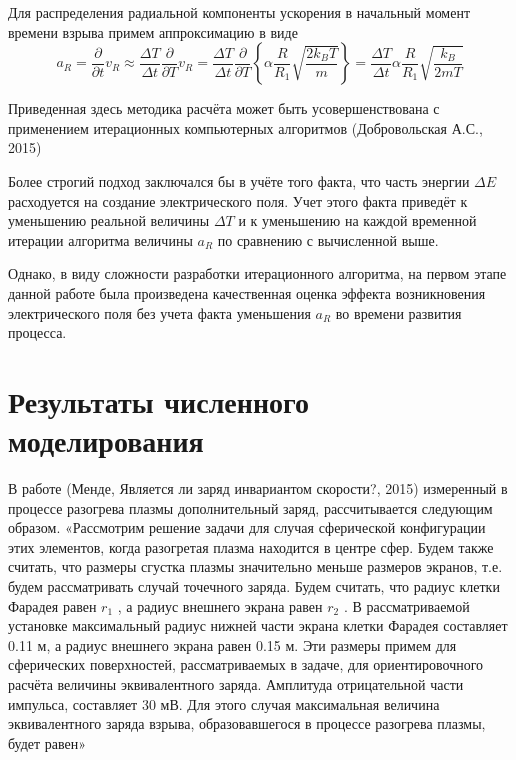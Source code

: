 ﻿\documentclass[12pt, letterpaper]{article}
\begin{document}
Для распределения радиальной компоненты ускорения в начальный момент времени взрыва примем аппроксимацию в виде
$${{a}_{R}}=\frac{\partial }{\partial t}{{v}_{R}}\approx \frac{\Delta T}{\Delta t}\frac{\partial }{\partial T}{{v}_{R}}=\frac{\Delta T}{\Delta t}\frac{\partial }{\partial T}\left\{ \alpha \frac{R}{{{R}_{1}}}\sqrt{\frac{2{{k}_{B}}T}{m}} \right\}=\frac{\Delta T}{\Delta t}\alpha \frac{R}{{{R}_{1}}}\sqrt{\frac{{{k}_{B}}}{2mT}}$$


Приведенная здесь методика расчёта может быть усовершенствована с применением итерационных компьютерных алгоритмов (Добровольская А.С., 2015)

Более строгий подход заключался бы в учёте того факта, что часть энергии $\Delta E$ расходуется на создание электрического поля. Учет этого факта приведёт к уменьшению реальной величины $\Delta T$ и к уменьшению на каждой временной итерации алгоритма величины ${{a}_{R}}$ по сравнению с вычисленной выше. 

Однако, в виду сложности разработки итерационного алгоритма, на первом этапе данной работе была произведена качественная оценка эффекта возникновения электрического поля без учета факта уменьшения ${{a}_{R}}$ во времени развития процесса.

\section{Результаты численного моделирования}




В работе (Менде, Является ли заряд инвариантом скорости?, 2015) измеренный в процессе разогрева плазмы дополнительный заряд, рассчитывается следующим образом. «Рассмотрим решение задачи для случая сферической конфигурации этих элементов, когда разогретая плазма находится в центре сфер. Будем также считать, что размеры сгустка плазмы значительно меньше размеров экранов, т.е. будем рассматривать случай точечного заряда. Будем считать, что радиус клетки Фарадея равен ${{r}_{1}}$ , а радиус внешнего экрана равен ${{r}_{2}}$ . В рассматриваемой установке максимальный радиус нижней части экрана клетки Фарадея составляет 0.11 м, а радиус внешнего экрана равен 0.15 м. Эти размеры примем для сферических поверхностей, рассматриваемых в задаче, для ориентировочного расчёта величины эквивалентного заряда. Амплитуда отрицательной части импульса, составляет 30 мВ. Для этого случая максимальная величина эквивалентного заряда взрыва, образовавшегося в процессе разогрева плазмы, будет равен» 
\end{document}
